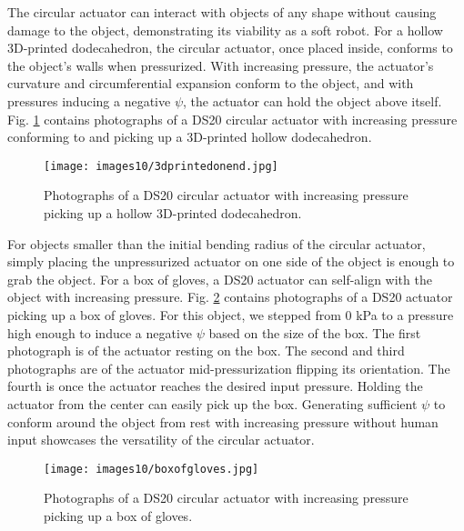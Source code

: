 The circular actuator can interact with objects of any shape without causing damage to the object, demonstrating its viability as a soft robot. For a hollow 3D-printed dodecahedron, the circular actuator, once placed inside, conforms to the object's walls when pressurized. With increasing pressure, the actuator's curvature and circumferential expansion conform to the object, and with pressures inducing a negative $\psi$, the actuator can hold the object above itself. Fig. \ref{fig:3dprintedonend} contains photographs of a DS20 circular actuator with increasing pressure conforming to and picking up a 3D-printed hollow dodecahedron. 

\begin{figure}[!ht]
    \centering
    \texttt{[image: images10/3dprintedonend.jpg]}
    \caption{Photographs of a DS20 circular actuator with increasing pressure picking up a hollow 3D-printed dodecahedron.}
    \label{fig:3dprintedonend}
\end{figure}

For objects smaller than the initial bending radius of the circular actuator, simply placing the unpressurized actuator on one side of the object is enough to grab the object. For a box of gloves, a DS20 actuator can self-align with the object with increasing pressure. Fig. \ref{fig:boxofgloves} contains photographs of a DS20 actuator picking up a box of gloves. For this object, we stepped from 0 kPa to a pressure high enough to induce a negative $\psi$ based on the size of the box. The first photograph is of the actuator resting on the box. The second and third photographs are of the actuator mid-pressurization flipping its orientation. The fourth is once the actuator reaches the desired input pressure. Holding the actuator from the center can easily pick up the box. Generating sufficient $\psi$ to conform around the object from rest with increasing pressure without human input showcases the versatility of the circular actuator. 

\begin{figure}[!ht]
    \centering
     \texttt{[image: images10/boxofgloves.jpg]}
    \caption{Photographs of a DS20 circular actuator with increasing pressure picking up a box of gloves.}
    \label{fig:boxofgloves}
\end{figure}

